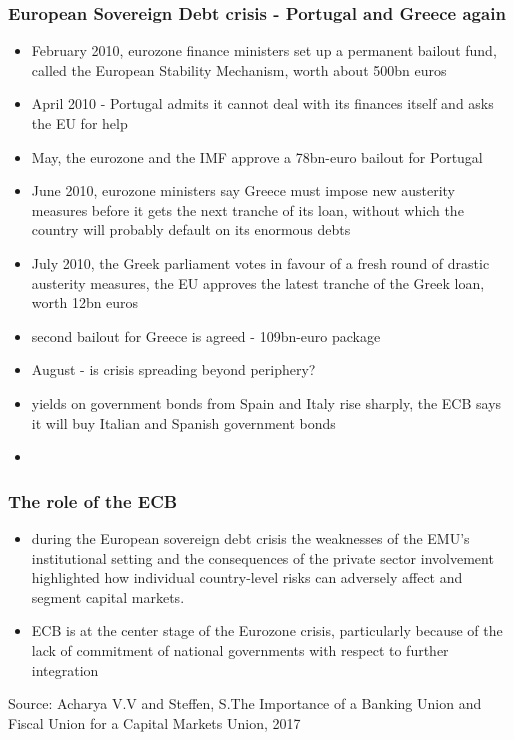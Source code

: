 \documentclass[11pt]{beamer}
\begin{document}
\begin{frame}
\frametitle{European Sovereign Debt crisis - Portugal and Greece again}
\begin{itemize}
\item  February 2010, eurozone finance ministers set up a permanent bailout fund, called the European Stability Mechanism, worth about 500bn euros
\item April 2010 - Portugal admits it cannot deal with its finances itself and asks the EU for help
\item May, the eurozone and the IMF approve a 78bn-euro bailout for Portugal
\item June 2010, eurozone ministers say Greece must impose new austerity measures before it gets the next tranche of its loan, without which the country will probably default on its enormous debts
\item July 2010, the Greek parliament votes in favour of a fresh round of drastic austerity measures, the EU approves the latest tranche of the Greek loan, worth 12bn euros
\item second bailout for Greece is agreed - 109bn-euro package
\item August - is crisis spreading beyond periphery?
\item yields on government bonds from Spain and Italy rise sharply, the ECB says it will buy Italian and Spanish government bonds
\end{itemize}

\begin{itemize}

\item
\end{itemize}
\end{frame}




\begin{frame}
\frametitle{The role of the ECB}
\begin{itemize}
\item during the European sovereign debt crisis the weaknesses of the EMU’s institutional setting and the consequences of the private sector involvement highlighted how individual country-level risks can adversely affect and segment capital markets.
\item ECB is at the center stage of the Eurozone crisis, particularly because of the lack of commitment of national governments with respect to further integration
\end{itemize}
\tiny{Source: Acharya V.V and Steffen, S.The Importance of a Banking Union and Fiscal Union for a Capital Markets Union, 2017}
\end{frame}
\end{document}
